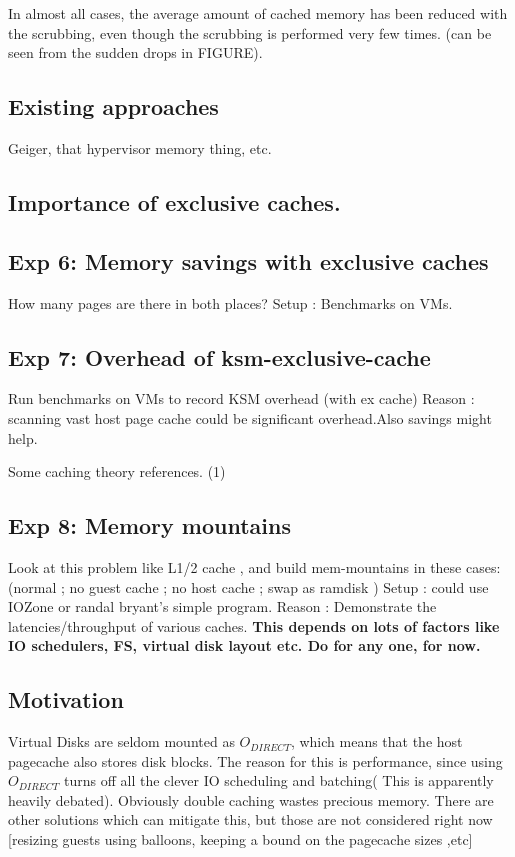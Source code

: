 \documentclass[10pt,a4paper]{article}
\begin{document}
In almost all cases, the average amount of cached memory has been reduced with the scrubbing, even though the scrubbing is performed very few times. (can be seen from the sudden drops in FIGURE). 

\subsection{Existing approaches}

Geiger, that hypervisor memory thing, etc.
\subsection{Importance of exclusive caches.}

\subsection{Exp 6: Memory savings with exclusive caches}

How many pages are there in both places?
Setup : Benchmarks on VMs.

\subsection{Exp 7: Overhead of ksm-exclusive-cache}

Run benchmarks on VMs to record KSM overhead (with ex cache)
Reason : scanning vast host page cache could be significant overhead.Also savings might help.

Some caching theory references.
(1)

\subsection{Exp 8: Memory mountains}

Look at this problem like L1/2 cache , and build mem-mountains in these cases:
(normal ; no guest cache ; no host cache ; swap as ramdisk )
Setup : could use IOZone or randal bryant's simple program.
Reason : Demonstrate the latencies/throughput of various caches. 
\textbf{This depends on lots of factors like IO schedulers, FS, virtual disk layout etc. Do for any one, for now.}


\subsection{Motivation}

 Virtual Disks are seldom mounted as $O_{DIRECT}$, which means that the  host pagecache also stores disk blocks. The reason for this is performance,  since using $O_{DIRECT}$ turns off all the clever IO scheduling and batching( This is apparently heavily debated).
Obviously double caching wastes precious memory. There are other solutions which can mitigate this, but those are not considered right now [resizing guests using balloons, keeping a bound on the pagecache sizes ,etc]
\end{document}
